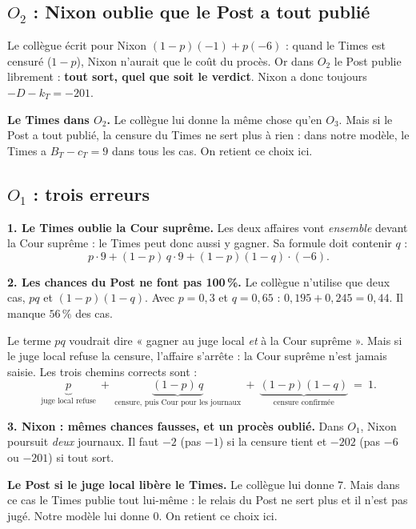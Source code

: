 \documentclass[11pt,a4paper]{article}
\theoremstyle{definition}
\begin{document}
\subsection{$O_2$ : Nixon oublie que le Post a tout publié}
\begin{erreur}
Le collègue écrit pour Nixon $(1-p)(-1)+p(-6)$ : quand le Times est censuré ($1-p$), Nixon n'aurait que le coût du procès. Or dans $O_2$ le Post publie librement : \textbf{tout sort, quel que soit le verdict}. Nixon a donc toujours $-D-k_T=-201$.
\end{erreur}
\begin{discuter}
\textbf{Le Times dans $O_2$.} Le collègue lui donne la même chose qu'en $O_3$. Mais si le Post a tout publié, la censure du Times ne sert plus à rien : dans notre modèle, le Times a $B_T-c_T=9$ dans tous les cas. On retient ce choix ici.
\end{discuter}

\subsection{$O_1$ : trois erreurs}
\begin{erreur}
\textbf{1. Le Times oublie la Cour suprême.} Les deux affaires vont \emph{ensemble} devant la Cour suprême : le Times peut donc aussi y gagner. Sa formule doit contenir $q$ :
\[
p\cdot9+(1-p)\,q\cdot9+(1-p)(1-q)\cdot(-6).
\]
\end{erreur}
\begin{erreur}
\textbf{2. Les chances du Post ne font pas 100\,\%.} Le collègue n'utilise que deux cas, $pq$ et $(1-p)(1-q)$. Avec $p=0,3$ et $q=0,65$ : $0,195+0,245=0,44$. Il manque $56\,\%$ des cas.

Le terme $pq$ voudrait dire « gagner au juge local \emph{et} à la Cour suprême ». Mais si le juge local refuse la censure, l'affaire s'arrête : la Cour suprême n'est jamais saisie. Les trois chemins corrects sont :
\[
\underbrace{p}_{\text{juge local refuse}}\ +\ \underbrace{(1-p)\,q}_{\text{censure, puis Cour pour les journaux}}\ +\ \underbrace{(1-p)(1-q)}_{\text{censure confirmée}}\ =\ 1 .
\]
\end{erreur}
\begin{erreur}
\textbf{3. Nixon : mêmes chances fausses, et un procès oublié.} Dans $O_1$, Nixon poursuit \emph{deux} journaux. Il faut $-2$ (pas $-1$) si la censure tient et $-202$ (pas $-6$ ou $-201$) si tout sort.
\end{erreur}
\begin{discuter}
\textbf{Le Post si le juge local libère le Times.} Le collègue lui donne $7$. Mais dans ce cas le Times publie tout lui-même : le relais du Post ne sert plus et il n'est pas jugé. Notre modèle lui donne $0$. On retient ce choix ici.
\end{discuter}
\end{document}
